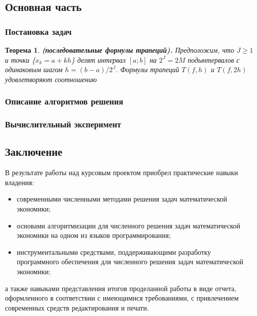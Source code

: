 \documentclass[14pt, titlepage, a4paper]{extarticle} %
\newtheorem{theorem}{Теорема}
\begin{document}
	
	\pagebreak
	
	
	\subsection*{Основная часть}
	
	\subsubsection*{Постановка задач}
	
	\begin{theorem}\label{th:1}
		\textbf{(последовательные формулы трапеций).} Предположим, что $J \geqslant 1$ и точки \{$x_k = a + kh$\} делят интервал $\left[a; b\right]$ на $2^J = 2M$ подынтервалов с одинаковым шагом $h = (b-a)/2^J$. Формулы трапеций $T(f,h)$ и $T(f,2h)$ удовлетворяют соотношению
	\end{theorem}
	
	
	
	
	\subsubsection*{Описание алгоритмов решения}
	
	\subsubsection*{Вычислительный эксперимент}
	
	\pagebreak
	
	
	\subsection*{Заключение}
	
	В результате работы над курсовым проектом приобрел практические навыки владения:
	\begin{itemize}
		\item современными численными методами решения задач математической экономики;
		\item основами алгоритмизации для численного решения задач математической экономики на одном из языков программирования;
		\item инструментальными средствами, поддерживающими разработку программного обеспечения для численного решения задач математической экономики; 
	\end{itemize}
	а также навыками представления итогов проделанной работы в виде отчета, оформленного в соответствии с имеющимися требованиями, с привлечением современных средств редактирования и печати.
	
\end{document}
